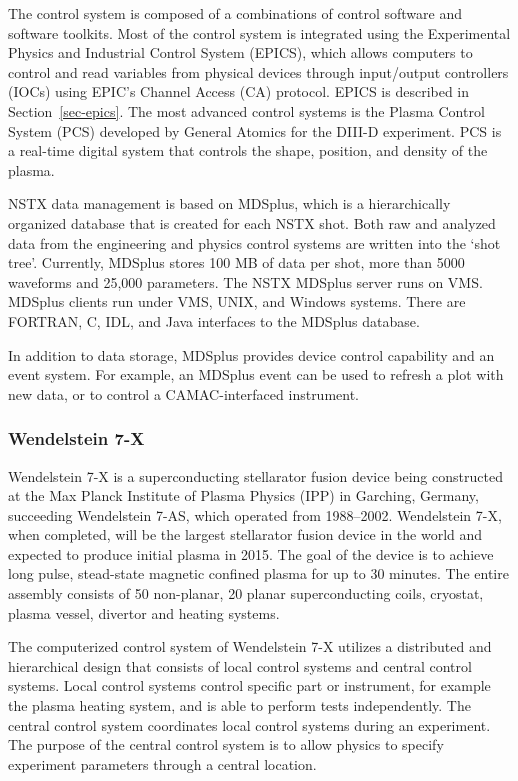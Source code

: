 The control system is composed of a combinations of control software and software toolkits\cite{sichta2001overview,gates2000initialnstx}. Most of the control system is integrated using the Experimental Physics and Industrial Control System (EPICS), which allows computers to control and read variables from physical devices through input/output controllers (IOCs) using EPIC's Channel Access (CA) protocol. EPICS is described in Section~\ref{sec-epics}. The most advanced control systems is the Plasma Control System (PCS) developed by General Atomics for the DIII-D experiment. PCS is a real-time digital system that controls the shape, position, and density of the plasma.

NSTX data management is based on MDSplus, which is a hierarchically organized database that is created for each NSTX shot. Both raw and analyzed data from the engineering and physics control systems are written into the `shot tree'. Currently, MDSplus stores 100 MB of data per shot, more than 5000 waveforms and 25,000 parameters. The NSTX MDSplus server runs on VMS. MDSplus clients run under VMS, UNIX, and Windows systems. There are FORTRAN, C, IDL, and Java interfaces to the MDSplus database.

In addition to data storage, MDSplus provides device control capability and an event system. For example, an MDSplus event can be used to refresh a plot with new data, or to control a CAMAC-interfaced instrument.

\subsubsection{Wendelstein 7-X}

Wendelstein 7-X\cite{wegener2009status} is a superconducting stellarator fusion device being constructed at the Max Planck Institute of Plasma Physics (IPP) in Garching, Germany, succeeding Wendelstein 7-AS, which operated from 1988--2002\cite{hirsch2008major}. Wendelstein 7-X, when completed, will be the largest stellarator fusion device in the world and expected to produce initial plasma in 2015. The goal of the device is to achieve long pulse, stead-state magnetic confined plasma for up to 30 minutes. The entire assembly consists of 50 non-planar, 20 planar superconducting coils, cryostat, plasma vessel, divertor and heating systems\cite{bosch2010construction}.

The computerized control system of Wendelstein 7-X utilizes a distributed and hierarchical design that consists of local control systems and central control systems. Local control systems control specific part or instrument, for example the plasma heating system, and is able to perform tests independently. The central control system coordinates local control systems during an experiment. The purpose of the central control system is to allow physics to specify experiment parameters through a central location\cite{schacht2007overview}.

